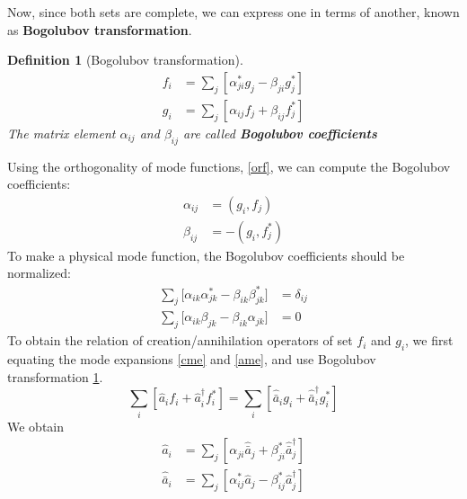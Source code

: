 \documentclass[12pt]{article}
\numberwithin{equation}{section}
\theoremstyle{1style}
\newtheorem{definition}[equation]{Definition}
\newcommand{\tbf}[1]{\textbf{#1}}
\begin{document}
Now, since both sets are complete, we can express one in terms of another, known as \tbf{Bogolubov transformation}.
\begin{definition}[Bogolubov transformation]\label{bt}
  \begin{align*}
    f_i & =\sum_j\left[\alpha^*_{ji}g_j-\beta_{ji}g^*_j\right] \\
    g_i & =\sum_j\left[\alpha_{ij}f_j+\beta_{ij}f_j^*\right]
  \end{align*}
  The matrix element \(\alpha_{ij}\) and \(\beta_{ij}\) are called \tbf{Bogolubov coefficients}
\end{definition}
Using the orthogonality of mode functions, \ref{orf}, we can compute the Bogolubov coefficients:
\begin{align}
  \alpha_{ij} & =(g_i,f_j)     \\
  \beta_{ij}  & = -(g_i,f_j^*)
\end{align}
To make a physical mode function, the Bogolubov coefficients should be normalized:
\begin{align}
  \sum_j\bigl[\alpha_{ik}\alpha^*_{jk}-\beta_{ik}\beta^*_{jk}\bigr] & =\delta_{ij} \\
  \sum_j\bigl[\alpha_{ik}\beta_{jk}-\beta_{ik}\alpha_{jk}\bigr]     & =0
\end{align}
To obtain the relation of creation/annihilation operators of set \(f_i\) and \(g_i\),
we first equating the mode expansions \ref{cme} and \ref{ame}, and use Bogolubov transformation \ref{bt}.
\begin{equation}
  \sum_i\left[\hat{a}_i f_i+\hat{a}_i^\dagger f_i^*\right]=\sum_i\left[\hat{\bar{a}}_i g_i+\hat{\bar{a}}_i^\dagger g_i^*\right]
\end{equation}
We obtain
\begin{align}
  \hat{a}_i       & =\sum_j\left[\alpha_{ji}\hat{\bar{a}}_j+\beta^*_{ji}\hat{\bar{a}}^{\dagger}_j\right] \\
  \hat{\bar{a}}_i & =\sum_j\left[\alpha^*_{ij}\hat{a}_j-\beta^*_{ij}\hat{a}^{\dagger}_j\right]
\end{align}
\end{document}
